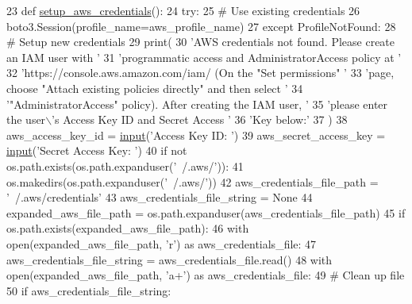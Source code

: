\begin{DoxyCode}
23 \textcolor{keyword}{def }\hyperlink{namespaceparlai_1_1mturk_1_1core_1_1mturk__utils_a018a49fdf2cf6ff4c0b279d2f5b1bff0}{setup\_aws\_credentials}():
24     \textcolor{keywordflow}{try}:
25         \textcolor{comment}{# Use existing credentials}
26         boto3.Session(profile\_name=aws\_profile\_name)
27     \textcolor{keywordflow}{except} ProfileNotFound:
28         \textcolor{comment}{# Setup new credentials}
29         print(
30             \textcolor{stringliteral}{'AWS credentials not found. Please create an IAM user with '}
31             \textcolor{stringliteral}{'programmatic access and AdministratorAccess policy at '}
32             \textcolor{stringliteral}{'https://console.aws.amazon.com/iam/ (On the "Set permissions" '}
33             \textcolor{stringliteral}{'page, choose "Attach existing policies directly" and then select '}
34             \textcolor{stringliteral}{'"AdministratorAccess" policy). After creating the IAM user, '}
35             \textcolor{stringliteral}{'please enter the user\(\backslash\)'s Access Key ID and Secret Access '}
36             \textcolor{stringliteral}{'Key below:'}
37         )
38         aws\_access\_key\_id = \hyperlink{namespaceparlai_1_1mturk_1_1core_1_1dev_1_1test_1_1test__full__system_a1e1817cd65688fb90f827834d1fb4567}{input}(\textcolor{stringliteral}{'Access Key ID: '})
39         aws\_secret\_access\_key = \hyperlink{namespaceparlai_1_1mturk_1_1core_1_1dev_1_1test_1_1test__full__system_a1e1817cd65688fb90f827834d1fb4567}{input}(\textcolor{stringliteral}{'Secret Access Key: '})
40         \textcolor{keywordflow}{if} \textcolor{keywordflow}{not} os.path.exists(os.path.expanduser(\textcolor{stringliteral}{'~/.aws/'})):
41             os.makedirs(os.path.expanduser(\textcolor{stringliteral}{'~/.aws/'}))
42         aws\_credentials\_file\_path = \textcolor{stringliteral}{'~/.aws/credentials'}
43         aws\_credentials\_file\_string = \textcolor{keywordtype}{None}
44         expanded\_aws\_file\_path = os.path.expanduser(aws\_credentials\_file\_path)
45         \textcolor{keywordflow}{if} os.path.exists(expanded\_aws\_file\_path):
46             with open(expanded\_aws\_file\_path, \textcolor{stringliteral}{'r') as aws\_credentials\_file:}
47 \textcolor{stringliteral}{                aws\_credentials\_file\_string = aws\_credentials\_file.read()}
48 \textcolor{stringliteral}{        with open(expanded\_aws\_file\_path, 'a+'}) \textcolor{keyword}{as} aws\_credentials\_file:
49             \textcolor{comment}{# Clean up file}
50             \textcolor{keywordflow}{if} aws\_credentials\_file\_string:

\end{DoxyCode}
